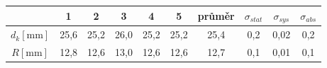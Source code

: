 \begin{tabular}{cccccccccc}															\toprule
							&	1	&	2	&	3	&	4	&	5	&	průměr	&	$\sigma_{stat}$		&	$\sigma_{sys}$		&	$\sigma_{abs}$	\\	\midrule
$d_k [\si{\milli\metre}]$	&	25,6&	25,2&	26,0&	25,2&	25,2&	25,4	&	0,2					&	0,02				&	0,2				\\	
$R [\si{\milli\metre}]$		&	12,8&	12,6&	13,0&	12,6&	12,6&	12,7	&	0,1					&	0,01				&	0,1				\\ \bottomrule
\end{tabular}
